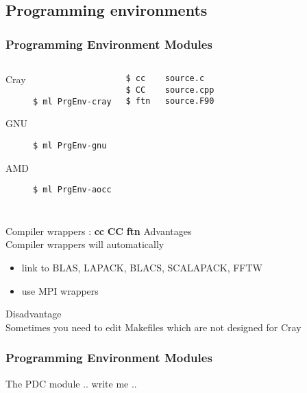 \subsection{Programming environments}
\begin{frame}[fragile]
  \frametitle{Programming Environment Modules}

\begin{columns}[t]
  \begin{description}
  \item [Cray] \verb|$ ml PrgEnv-cray|
  \item [GNU] \verb|$ ml PrgEnv-gnu|
  \item [AMD] \verb|$ ml PrgEnv-aocc|
  \end{description}
    \begin{verbatim}
$ cc	source.c
$ CC	source.cpp
$ ftn	source.F90
  \end{verbatim}
\end{columns}
  \begin{exampleblock}{Compiler wrappers : \alert{\textbf{cc} \textbf{CC} \textbf{ftn}}}
    \alert{Advantages}\\
    Compiler wrappers will automatically 
    \begin{itemize}
      \item link to BLAS, LAPACK, BLACS, SCALAPACK, FFTW\\
      \item use MPI wrappers\\
    \end{itemize}
    \alert{Disadvantage}\\
    Sometimes you need to edit Makefiles which are not designed for Cray 
\end{exampleblock}
\end{frame}


\begin{frame}[fragile]
\frametitle{Programming Environment Modules}
    \begin{exampleblock}{The PDC module}
        .. write me ..
    \end{exampleblock}
\end{frame}
